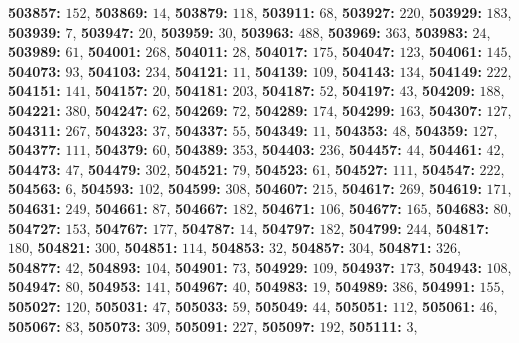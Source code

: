 \textsf{\bfseries 503857:} $152$, \textsf{\bfseries 503869:} $14$, \textsf{\bfseries 503879:} $118$, \textsf{\bfseries 503911:} $68$, \textsf{\bfseries 503927:} $220$, \textsf{\bfseries 503929:} $183$, \textsf{\bfseries 503939:} $7$, \textsf{\bfseries 503947:} $20$, \textsf{\bfseries 503959:} $30$, \textsf{\bfseries 503963:} $488$, \textsf{\bfseries 503969:} $363$, \textsf{\bfseries 503983:} $24$, \textsf{\bfseries 503989:} $61$, \textsf{\bfseries 504001:} $268$, \textsf{\bfseries 504011:} $28$, \textsf{\bfseries 504017:} $175$, \textsf{\bfseries 504047:} $123$, \textsf{\bfseries 504061:} $145$, \textsf{\bfseries 504073:} $93$, \textsf{\bfseries 504103:} $234$, \textsf{\bfseries 504121:} $11$, \textsf{\bfseries 504139:} $109$, \textsf{\bfseries 504143:} $134$, \textsf{\bfseries 504149:} $222$, \textsf{\bfseries 504151:} $141$, \textsf{\bfseries 504157:} $20$, \textsf{\bfseries 504181:} $203$, \textsf{\bfseries 504187:} $52$, \textsf{\bfseries 504197:} $43$, \textsf{\bfseries 504209:} $188$, \textsf{\bfseries 504221:} $380$, \textsf{\bfseries 504247:} $62$, \textsf{\bfseries 504269:} $72$, \textsf{\bfseries 504289:} $174$, \textsf{\bfseries 504299:} $163$, \textsf{\bfseries 504307:} $127$, \textsf{\bfseries 504311:} $267$, \textsf{\bfseries 504323:} $37$, \textsf{\bfseries 504337:} $55$, \textsf{\bfseries 504349:} $11$, \textsf{\bfseries 504353:} $48$, \textsf{\bfseries 504359:} $127$, \textsf{\bfseries 504377:} $111$, \textsf{\bfseries 504379:} $60$, \textsf{\bfseries 504389:} $353$, \textsf{\bfseries 504403:} $236$, \textsf{\bfseries 504457:} $44$, \textsf{\bfseries 504461:} $42$, \textsf{\bfseries 504473:} $47$, \textsf{\bfseries 504479:} $302$, \textsf{\bfseries 504521:} $79$, \textsf{\bfseries 504523:} $61$, \textsf{\bfseries 504527:} $111$, \textsf{\bfseries 504547:} $222$, \textsf{\bfseries 504563:} $6$, \textsf{\bfseries 504593:} $102$, \textsf{\bfseries 504599:} $308$, \textsf{\bfseries 504607:} $215$, \textsf{\bfseries 504617:} $269$, \textsf{\bfseries 504619:} $171$, \textsf{\bfseries 504631:} $249$, \textsf{\bfseries 504661:} $87$, \textsf{\bfseries 504667:} $182$, \textsf{\bfseries 504671:} $106$, \textsf{\bfseries 504677:} $165$, \textsf{\bfseries 504683:} $80$, \textsf{\bfseries 504727:} $153$, \textsf{\bfseries 504767:} $177$, \textsf{\bfseries 504787:} $14$, \textsf{\bfseries 504797:} $182$, \textsf{\bfseries 504799:} $244$, \textsf{\bfseries 504817:} $180$, \textsf{\bfseries 504821:} $300$, \textsf{\bfseries 504851:} $114$, \textsf{\bfseries 504853:} $32$, \textsf{\bfseries 504857:} $304$, \textsf{\bfseries 504871:} $326$, \textsf{\bfseries 504877:} $42$, \textsf{\bfseries 504893:} $104$, \textsf{\bfseries 504901:} $73$, \textsf{\bfseries 504929:} $109$, \textsf{\bfseries 504937:} $173$, \textsf{\bfseries 504943:} $108$, \textsf{\bfseries 504947:} $80$, \textsf{\bfseries 504953:} $141$, \textsf{\bfseries 504967:} $40$, \textsf{\bfseries 504983:} $19$, \textsf{\bfseries 504989:} $386$, \textsf{\bfseries 504991:} $155$, \textsf{\bfseries 505027:} $120$, \textsf{\bfseries 505031:} $47$, \textsf{\bfseries 505033:} $59$, \textsf{\bfseries 505049:} $44$, \textsf{\bfseries 505051:} $112$, \textsf{\bfseries 505061:} $46$, \textsf{\bfseries 505067:} $83$, \textsf{\bfseries 505073:} $309$, \textsf{\bfseries 505091:} $227$, \textsf{\bfseries 505097:} $192$, \textsf{\bfseries 505111:} $3$, 
